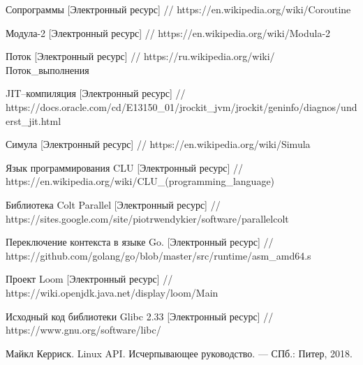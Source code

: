 \begingroup 
\renewcommand{\section}[2]{\anonsection{Библиографический список}}
\begin{flushleft}
\begin{thebibliography}{}

	
    Сопрограммы
    [Электронный ресурс] //
    https://en.wikipedia.org/wiki/Coroutine

	Модула-2
	[Электронный ресурс] //
	https://en.wikipedia.org/wiki/Modula-2
	
	Поток
	[Электронный ресурс] //
	https://ru.wikipedia.org/wiki/Поток\_выполнения
	
	JIT--компиляция 
	[Электронный ресурс] //
	https://docs.oracle.com/cd/E13150\_01/jrockit\_jvm/jrockit/geninfo/diagnos/underst\_jit.html
	
	Симула
	[Электронный ресурс] //
	https://en.wikipedia.org/wiki/Simula
	
	Язык программирования CLU
	[Электронный ресурс] //
	https://en.wikipedia.org/wiki/CLU\_(programming\_language)
	
	Библиотека Colt Parallel
	[Электронный ресурс] //
	https://sites.google.com/site/piotrwendykier/software/parallelcolt
	
	Переключение контекста в языке Go.
	[Электронный ресурс] //
	https://github.com/golang/go/blob/master/src/runtime/asm\_amd64.s
	
	Проект Loom
	[Электронный ресурс] //
	https://wiki.openjdk.java.net/display/loom/Main
	
	Исходный код библиотеки Glibc 2.33
	[Электронный ресурс] //
	https://www.gnu.org/software/libc/ %

	Майкл Керриск. Linux API. Исчерпывающее руководство. — СПб.: Питер, 2018.

\end{thebibliography}
\end{flushleft}
\endgroup

\clearpage
